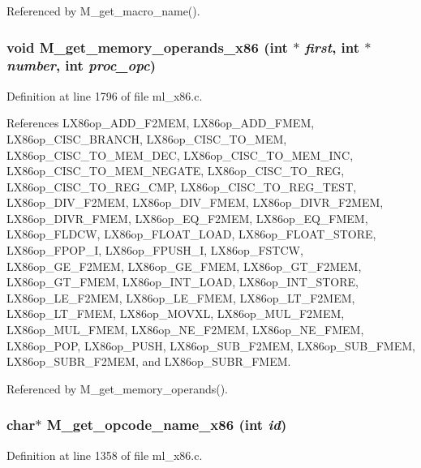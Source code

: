 Referenced by M\_\-get\_\-macro\_\-name().
\subsubsection{\setlength{\rightskip}{0pt plus 5cm}void M\_\-get\_\-memory\_\-operands\_\-x86 (int $\ast$ {\em first}, int $\ast$ {\em number}, int {\em proc\_\-opc})}\label{m__x86_8h_4e1b8aa32d43a1062c2ee16273f9f85e}




Definition at line 1796 of file ml\_\-x86.c.

References LX86op\_\-ADD\_\-F2MEM, LX86op\_\-ADD\_\-FMEM, LX86op\_\-CISC\_\-BRANCH, LX86op\_\-CISC\_\-TO\_\-MEM, LX86op\_\-CISC\_\-TO\_\-MEM\_\-DEC, LX86op\_\-CISC\_\-TO\_\-MEM\_\-INC, LX86op\_\-CISC\_\-TO\_\-MEM\_\-NEGATE, LX86op\_\-CISC\_\-TO\_\-REG, LX86op\_\-CISC\_\-TO\_\-REG\_\-CMP, LX86op\_\-CISC\_\-TO\_\-REG\_\-TEST, LX86op\_\-DIV\_\-F2MEM, LX86op\_\-DIV\_\-FMEM, LX86op\_\-DIVR\_\-F2MEM, LX86op\_\-DIVR\_\-FMEM, LX86op\_\-EQ\_\-F2MEM, LX86op\_\-EQ\_\-FMEM, LX86op\_\-FLDCW, LX86op\_\-FLOAT\_\-LOAD, LX86op\_\-FLOAT\_\-STORE, LX86op\_\-FPOP\_\-I, LX86op\_\-FPUSH\_\-I, LX86op\_\-FSTCW, LX86op\_\-GE\_\-F2MEM, LX86op\_\-GE\_\-FMEM, LX86op\_\-GT\_\-F2MEM, LX86op\_\-GT\_\-FMEM, LX86op\_\-INT\_\-LOAD, LX86op\_\-INT\_\-STORE, LX86op\_\-LE\_\-F2MEM, LX86op\_\-LE\_\-FMEM, LX86op\_\-LT\_\-F2MEM, LX86op\_\-LT\_\-FMEM, LX86op\_\-MOVXL, LX86op\_\-MUL\_\-F2MEM, LX86op\_\-MUL\_\-FMEM, LX86op\_\-NE\_\-F2MEM, LX86op\_\-NE\_\-FMEM, LX86op\_\-POP, LX86op\_\-PUSH, LX86op\_\-SUB\_\-F2MEM, LX86op\_\-SUB\_\-FMEM, LX86op\_\-SUBR\_\-F2MEM, and LX86op\_\-SUBR\_\-FMEM.

Referenced by M\_\-get\_\-memory\_\-operands().
\subsubsection{\setlength{\rightskip}{0pt plus 5cm}char$\ast$ M\_\-get\_\-opcode\_\-name\_\-x86 (int {\em id})}\label{m__x86_8h_f32831336bc4aefba4a652dd24697899}




Definition at line 1358 of file ml\_\-x86.c.


